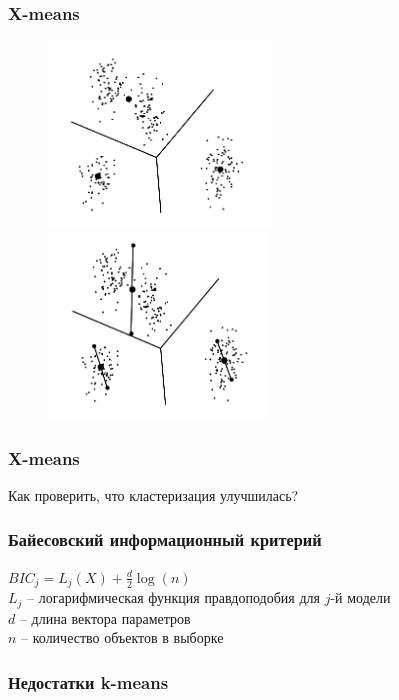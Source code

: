 \documentclass[12pt]{beamer}
\begin{document}
\begin{frame}\frametitle{X-means}

\begin{figure}[htbp]
  \includegraphics[height=140pt, keepaspectratio = true]{images/x-means}  
    \includegraphics[height=140pt, keepaspectratio = true]{images/x-means-1}
\end{figure}
\end{frame}

\begin{frame}\frametitle{X-means}
Как проверить, что кластеризация улучшилась?
\end{frame}

\begin{frame}\frametitle{Байесовский информационный критерий}
$BIC_j = L_j(X)  + \frac{d}{2} \log(n)$\\
\vspace{5mm}
$L_j$ -- логарифмическая функция правдоподобия для $j$-й модели \\
$d$ -- длина вектора параметров\\
$n$ -- количество объектов в выборке\\

\end{frame}

\begin{frame}\frametitle{Недостатки k-means}
\end{frame}
\end{document}
